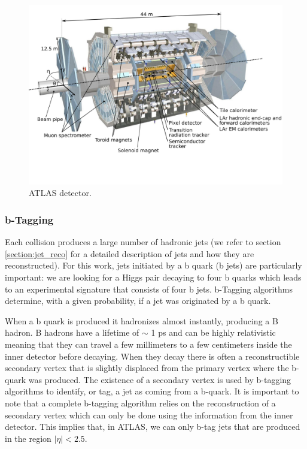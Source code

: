 \begin{figure}
	\centering
	\includegraphics[trim={0cm 3.5cm 0cm 0},clip,width=\textwidth]{./Figures/ATLASsvg3.png}
	\caption{ATLAS detector.}
	\label{fig:ATLAS_detector}
\end{figure} 

\subsubsection{b-Tagging}

Each collision produces a large number of hadronic jets (we refer to section \ref{section:jet_reco} for a detailed description of jets and how they are reconstructed). For this work, jets initiated by a b quark (b jets) are particularly important: we are looking for a Higgs pair decaying to four b quarks which leads to an experimental signature that consists of four b jets. b-Tagging algorithms determine, with a given probability, if a jet was originated by a b quark. 

When a b quark is produced it hadronizes almost instantly, producing a B hadron. B hadrons have a lifetime of $\sim$ 1 ps and can be highly relativistic meaning that they can travel a few millimeters to a few centimeters inside the inner detector before decaying. When they decay there is often a reconstructible secondary vertex that is slightly displaced from the primary vertex where the b-quark was produced. The existence of a secondary vertex is used by b-tagging algorithms to identify, or tag, a jet as coming from a b-quark. It is important to note that a complete b-tagging algorithm relies on the reconstruction of a secondary vertex which can only be done using the information from the inner detector. This implies that, in ATLAS, we can only b-tag jets that are produced in the region $|\eta|<2.5$.

